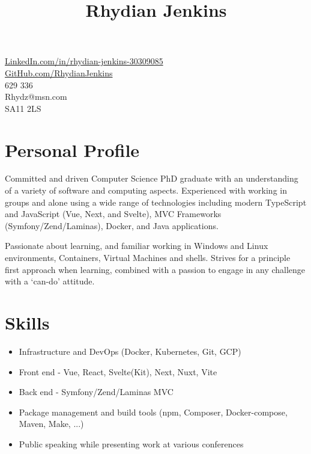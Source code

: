 \documentclass[10pt]{article}
\title{\bfseries\Huge Rhydian Jenkins}
\date{}
\author{}
\begin{document}
\maketitle \vspace{-7em}

\section*{}
\faLinkedin \quad \href{https://www.linkedin.com/in/rhydian-jenkins-30309085/}{LinkedIn.com/in/rhydian-jenkins-30309085}\\
\faGithub \quad \href{https://github.com/RhydianJenkins}{GitHub.com/RhydianJenkins}\\
\faPhone {} 629 336\\
\faEnvelope \quad Rhydz@msn.com\\
\faMapMarker \quad SA11 2LS

\section*{Personal Profile}
\noindent Committed and driven Computer Science PhD graduate with an understanding of a variety of software and computing aspects. Experienced with working in groups and alone using a wide range of technologies including modern TypeScript and JavaScript (Vue, Next, and Svelte), MVC Frameworks (Symfony/Zend/Laminas), Docker, and Java applications.

Passionate about learning, and familiar working in Windows and Linux environments, Containers, Virtual Machines and shells. Strives for a principle first approach when learning, combined with a passion to engage in any challenge with a `can-do' attitude.

\section*{Skills}
\begin{itemize} \setlength\itemsep{-0.25em}
	\item Infrastructure and DevOps (Docker, Kubernetes, Git, GCP)
    \item Front end - Vue, React, Svelte(Kit), Next, Nuxt, Vite
	\item Back end - Symfony/Zend/Laminas MVC
	\item Package management and build tools (npm, Composer, Docker-compose, Maven, Make, ...)
	\item Public speaking while presenting work at various conferences
\end{itemize}
\end{document}
